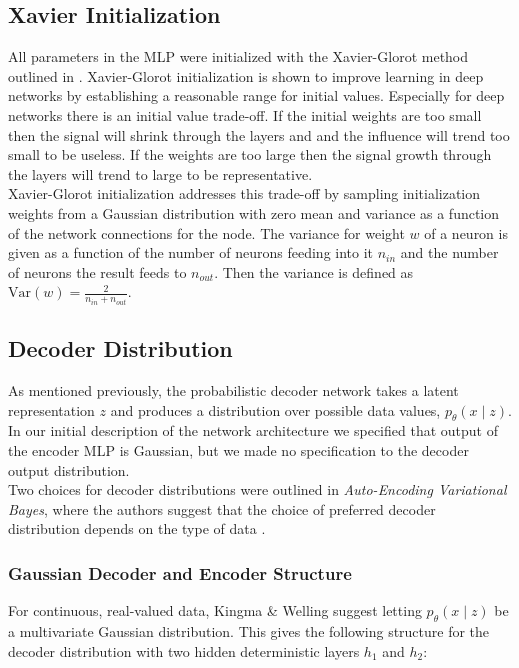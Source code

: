 \documentclass{article} %
\begin{document}
\subsection{Xavier Initialization}
All parameters in the MLP were initialized with the Xavier-Glorot method outlined in \cite{Glorot2010}. Xavier-Glorot initialization is shown to improve learning in deep networks by establishing a reasonable range for initial values. Especially for deep networks there is an initial value trade-off. If the initial weights are too small then the signal will shrink through the layers and and the influence will trend too small to be useless. If the weights are too large then the signal growth through the layers will trend to large to be representative.\\
Xavier-Glorot initialization addresses this trade-off by sampling initialization weights from a Gaussian distribution with zero mean and variance as a function of the network connections for the node. The variance for weight $w$  of a neuron is given as a function of the number of neurons feeding into it $n_{in}$ and the number of neurons the result feeds to $n_{out}$. Then the variance is defined as $\text{Var}(w) = \frac{2}{n_{in}+n_{out}}$.


\subsection{Decoder Distribution}
As mentioned previously, the probabilistic decoder network takes a latent representation $z$ and produces a distribution over possible data values, ${p_\theta(x\mid z)}$. In our initial description of the network architecture we specified that output of the encoder MLP is Gaussian, but we made no specification to the decoder output distribution. \\
Two choices for decoder distributions were outlined in \textit{Auto-Encoding Variational Bayes}, where the authors suggest that the choice of preferred decoder distribution depends on the type of data \cite{Kingma2013}. \\

\subsubsection{Gaussian Decoder and Encoder Structure}
For continuous, real-valued data, Kingma \& Welling suggest letting ${p_\theta(x\mid z)}$ be a multivariate Gaussian distribution. This gives the following structure for the decoder distribution with two hidden deterministic layers $h_1$ and $h_2$:
\end{document}
